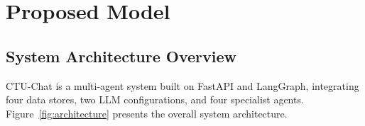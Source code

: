 \documentclass[runningheads]{llncs}
\begin{document}
\section{Proposed Model}
\label{sec:proposed}

\subsection{System Architecture Overview}
\label{sec:architecture}

CTU-Chat is a multi-agent system built on FastAPI and LangGraph, integrating four data stores, two LLM configurations, and four specialist agents. Figure~\ref{fig:architecture} presents the overall system architecture.
\end{document}
